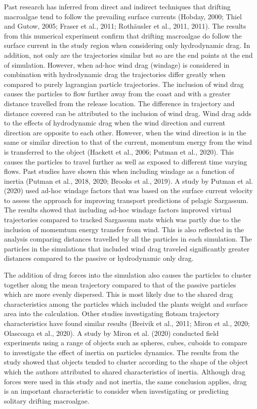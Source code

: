 \documentclass[
]{article}
\begin{document}
Past research has inferred from direct and indirect techniques that
drifting macroalgae tend to follow the prevailing surface currents
(Hobday, 2000; Thiel and Gutow, 2005; Fraser et al., 2011; Rothäusler et
al., 2011, 2011). The results from this numerical experiment confirm
that drifting macroalgae do follow the surface current in the study
region when considering only hydrodynamic drag. In addition, not only
are the trajectories similar but so are the end points at the end of
simulation. However, when ad-hoc wind drag (windage) is considered in
combination with hydrodynamic drag the trajectories differ greatly when
compared to purely lagrangian particle trajectories. The inclusion of
wind drag causes the particles to flow further away from the coast and
with a greater distance travelled from the release location. The
difference in trajectory and distance covered can be attributed to the
inclusion of wind drag. Wind drag adds to the effects of hydrodynamic
drag when the wind direction and current direction are opposite to each
other. However, when the wind direction is in the same or similar
direction to that of the current, momentum energy from the wind is
transferred to the object (Hackett et al., 2006; Putman et al., 2020).
This causes the particles to travel further as well as exposed to
different time varying flows. Past studies have shown this when
including windage as a function of inertia (Putman et al., 2018, 2020;
Brooks et al., 2019). A study by Putman et al. (2020) used ad-hoc
windage factors that was based on the surface current velocity to assess
the approach for improving transport predictions of pelagic Sargassum.
The results showed that including ad-hoc windage factors improved
virtual trajectories compared to tracked Sargassum mats which was partly
due to the inclusion of momemtum energy transfer from wind. This is also
reflected in the analysis comparing distances travelled by all the
particles in each simulation. The particles in the simulations that
included wind drag traveled significantly greater distances compared to
the passive or hydrodynamic only drag.

The addition of drag forces into the simulation also causes the
particles to cluster together along the mean trajectory compared to that
of the passive particles which are more evenly dispersed. This is most
likely due to the shared drag characteristics among the particles which
included the plants weight and surface area into the calculation. Other
studies investigating flotsam trajectory characteristics have found
similar results (Breivik et al., 2011; Miron et al., 2020; Olascoaga et
al., 2020). A study by Miron et al. (2020) conducted field experiments
using a range of objects such as spheres, cubes, cuboids to compare to
investigate the effect of inertia on particles dynamics. The results
from the study showed that objects tended to cluster according to the
shape of the object which the authors attributed to shared
characteristics of inertia. Although drag forces were used in this study
and not inertia, the same conclusion applies, drag is an important
characteristic to consider when investigating or predicting solitary
drifting macroalgae.
\end{document}
